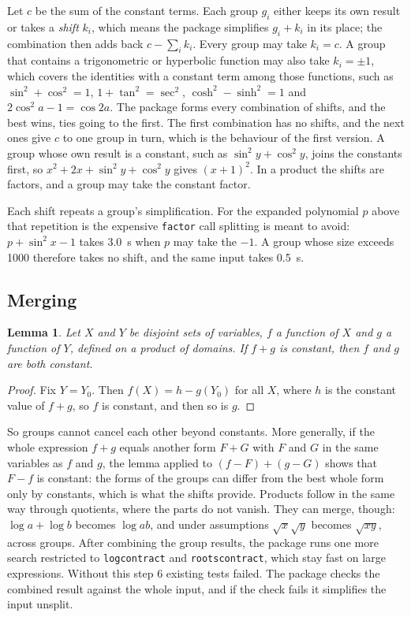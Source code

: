 \documentclass[11pt]{amsart}
\newcommand{\mx}{\lstinline[style=mx]}
\newtheorem{lemma}[proposition]{Lemma}
\theoremstyle{definition}
\theoremstyle{remark}
\begin{document}
Let $c$ be the sum of the constant terms. Each group $g_i$ either keeps its
own result or takes a \emph{shift} $k_i$, which means the package simplifies
$g_i + k_i$ in its place; the combination then adds back $c - \sum_i k_i$. Every group
may take $k_i = c$. A group that contains a trigonometric or hyperbolic
function may also take $k_i = \pm 1$, which covers the identities with a
constant term among those functions, such as $\sin^2 + \cos^2 = 1$, $1 +
\tan^2 = \sec^2$, $\cosh^2 - \sinh^2 = 1$ and $2\cos^2 a - 1 = \cos 2a$.
The package forms every combination of shifts, and the best wins, ties
going to the first. The first combination has no shifts, and the next ones
give $c$ to one group in turn, which is the behaviour of the first version. A group
whose own result is a constant, such as $\sin^2 y + \cos^2 y$, joins the
constants first, so $x^2 + 2x + \sin^2 y + \cos^2 y$ gives $(x+1)^2$. In a
product the shifts are factors, and a group may take the constant factor.

Each shift repeats a group's simplification. For the expanded polynomial
$p$ above that repetition is the expensive \mx|factor| call splitting is
meant to avoid: $p + \sin^2 x - 1$ takes 3.0~s when $p$ may take the $-1$. A
group whose size exceeds 1000 therefore takes no shift, and the same input
takes 0.5~s.

\subsection{Merging}

\begin{lemma}
Let $X$ and $Y$ be disjoint sets of variables, $f$ a function of $X$ and $g$
a function of $Y$, defined on a product of domains. If $f + g$ is constant,
then $f$ and $g$ are both constant.
\end{lemma}

\begin{proof}
Fix $Y = Y_0$. Then $f(X) = h - g(Y_0)$ for all $X$, where $h$ is the
constant value of $f + g$, so $f$ is constant, and then so is $g$.
\end{proof}

So groups cannot cancel each other beyond constants. More generally, if the
whole expression $f + g$ equals another form $F + G$ with $F$ and $G$ in the
same variables as $f$ and $g$, the lemma applied to $(f - F) + (g - G)$ shows
that $F - f$ is constant: the forms of the groups can differ from the best
whole form only by constants, which is what the shifts provide. Products
follow in the same way through quotients, where the parts do not vanish. They can merge, though: $\log a + \log b$
becomes $\log ab$, and under assumptions $\sqrt x\sqrt y$ becomes
$\sqrt{xy}$, across groups. After combining the group results, the package
runs one more search restricted to \mx|logcontract| and \mx|rootscontract|,
which stay fast on large expressions. Without this step 6 existing tests
failed. The package checks the combined result against the whole input, and
if the check fails it simplifies the input unsplit.
\end{document}
